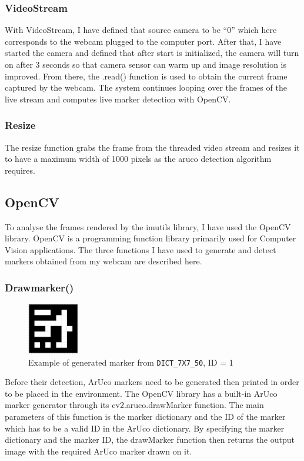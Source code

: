 \documentclass[oneside,%
                    author={Malak Hajji},
                    degree={BSc},
                    title={Designing An Accessible Computational Toolkit For Students},
                  subtitle={With Mixed Visual Abilities}]{dissertation}
\begin{document}
\subsubsection{VideoStream}
With VideoStream, I have defined that source camera to be “0” which here corresponds to the webcam plugged to the computer port. After that, I have started the camera and defined that after start is initialized, the camera will turn on after 3 seconds so that camera sensor can warm up and image resolution is improved. From there, the .read() function is used to obtain the current frame captured by the webcam. The system continues looping over the frames of the live stream and computes live marker detection with OpenCV.

\subsubsection{Resize}
The resize function grabs the frame from the threaded video stream and resizes it to have a maximum width of 1000 pixels as the aruco detection algorithm requires.

\subsection{OpenCV}
To analyse the frames rendered by the imutils library, I have used the OpenCV library. OpenCV is a programming function library primarily used for Computer Vision applications. The three functions I have used to generate and detect markers obtained from my webcam are described here. 

\subsubsection{Drawmarker()}
\FloatBarrier
\begin{figure}[h]
    \centering
    \includegraphics[width=0.2\textwidth]{thesis/marker.eps}
    \caption{Example of generated marker from  \texttt{DICT\_7X7\_50}, ID = 1}
    \label{fig-marker}
\end{figure}
\FloatBarrier
Before their detection, ArUco markers need to be generated then printed in order to be placed in the environment. The OpenCV library has a built-in ArUco marker generator through its cv2.aruco.drawMarker function. The main parameters of this function is the marker dictionary and the ID of the marker which has to be a valid ID in the ArUco dictionary. By specifying the marker dictionary and the marker ID, the drawMarker function then returns the output image with the required ArUco marker drawn on it. 
\end{document}
